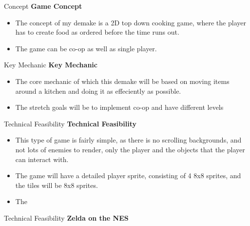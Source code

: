 \documentclass{beamer}
\begin{document}
\begin{frame}{Concept}		
	\textbf{Game Concept} \pause
		\begin{itemize}
			\item The concept of my demake is a 2D top down cooking game, where the player has to create food as ordered before the time runs out. \pause
			\item The game can be co-op as well as single player. \pause
			
		\end{itemize}
\end{frame}

\begin{frame}{Key Mechanic}		
	\textbf{Key Mechanic} \pause
		\begin{itemize}
			\item The core mechanic of which this demake will be based on moving items around a kitchen and doing it as effeciently as possible.  \pause
			\item The stretch goals will be to implement co-op and have different levels \pause

		\end{itemize}
\end{frame}

\begin{frame}{Technical Feasibility}		
	\textbf{Technical Feasibility} \pause
		\begin{itemize}
			\item This type of game is fairly simple, as there is no scrolling backgrounds, and not lots of enemies to render, only the player and the objects that the player can interact with. \pause
			\item The game will have a detailed player sprite, consisting of 4 8x8 sprites, and the tiles will be 8x8 sprites.  \pause
			\item The 
		\end{itemize}
\end{frame}

\begin{frame}{Technical Feasibility}
    \textbf{Zelda on the NES}
\end{frame}
\end{document}
